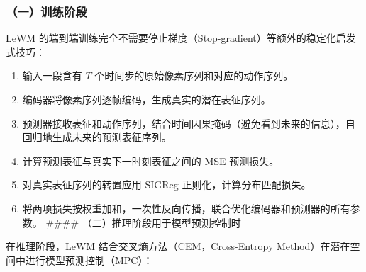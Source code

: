 \hypertarget{ux4e00ux8badux7ec3ux9636ux6bb5}{%
\subsubsection{（一）训练阶段}\label{ux4e00ux8badux7ec3ux9636ux6bb5}}

LeWM 的端到端训练完全不需要停止梯度（Stop-gradient）等额外的稳定化启发式技巧：

\begin{enumerate}
\def\labelenumi{\arabic{enumi}.}
\tightlist
\item
  输入一段含有 \(T\) 个时间步的原始像素序列和对应的动作序列。
\item
  编码器将像素序列逐帧编码，生成真实的潜在表征序列。
\item
  预测器接收表征和动作序列，结合时间因果掩码（避免看到未来的信息），自回归地生成未来的预测表征序列。
\item
  计算预测表征与真实下一时刻表征之间的 MSE 预测损失。
\item
  对真实表征序列的转置应用 SIGReg 正则化，计算分布匹配损失。
\item
  将两项损失按权重加和，一次性反向传播，联合优化编码器和预测器的所有参数。
  \#\#\#\# （二）推理阶段用于模型预测控制时
\end{enumerate}

在推理阶段，LeWM 结合交叉熵方法（CEM，Cross-Entropy Method）在潜在空间中进行模型预测控制（MPC）：

